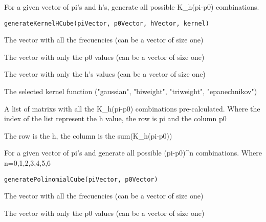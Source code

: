 \documentclass[letterpaper]{book}
\begin{document}
%
\begin{Description}\relax
For a given vector of pi's and h's, generate all possible K\_h(pi-p0) combinations.
\end{Description}
%
\begin{Usage}
\begin{verbatim}
generateKernelHCube(piVector, p0Vector, hVector, kernel)
\end{verbatim}
\end{Usage}
%
\begin{Arguments}
\begin{ldescription}
\item[\code{piVector}] The vector with all the frecuencies (can be a vector of size one)

\item[\code{p0Vector}] The vector with only the p0 values (can be a vector of size one)

\item[\code{hVector}] The vector with only the h's values (can be a vector of size one)

\item[\code{kernel}] The selected kernel function ("gaussian", "biweight", "triweight", "epanechnikov")
\end{ldescription}
\end{Arguments}
%
\begin{Value}
A list of matrixs with all the K\_h(pi-p0) combinations pre-calculated.
Where the index of the list represent the h value, the row is pi and the column p0

The row is the h, the column is the sum(K\_h(pi-p0))
\end{Value}
%
\begin{Description}\relax
For a given vector of pi's and generate all possible (pi-p0)\textasciicircum{}n combinations.
Where n=0,1,2,3,4,5,6
\end{Description}
%
\begin{Usage}
\begin{verbatim}
generatePolinomialCube(piVector, p0Vector)
\end{verbatim}
\end{Usage}
%
\begin{Arguments}
\begin{ldescription}
\item[\code{piVector}] The vector with all the frecuencies (can be a vector of size one)

\item[\code{p0Vector}] The vector with only the p0 values (can be a vector of size one)
\end{ldescription}
\end{Arguments}
\end{document}
